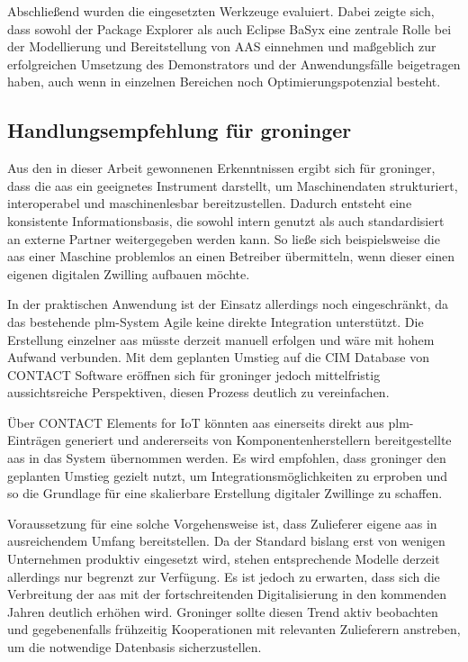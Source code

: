 Abschließend wurden die eingesetzten Werkzeuge evaluiert. 
Dabei zeigte sich, dass sowohl der Package Explorer als auch Eclipse BaSyx eine zentrale Rolle bei der Modellierung und Bereitstellung von AAS einnehmen und maßgeblich zur erfolgreichen Umsetzung des Demonstrators und der Anwendungsfälle beigetragen haben, auch wenn in einzelnen Bereichen noch Optimierungspotenzial besteht.

\newpage
\subsection{Handlungsempfehlung für groninger}

Aus den in dieser Arbeit gewonnenen Erkenntnissen ergibt sich für groninger, dass die \acs{aas} ein geeignetes Instrument darstellt, um Maschinendaten strukturiert, interoperabel und maschinenlesbar bereitzustellen. 
Dadurch entsteht eine konsistente Informationsbasis, die sowohl intern genutzt als auch standardisiert an externe Partner weitergegeben werden kann. 
So ließe sich beispielsweise die \acs{aas} einer Maschine problemlos an einen Betreiber übermitteln, wenn dieser einen eigenen digitalen Zwilling aufbauen möchte.

In der praktischen Anwendung ist der Einsatz allerdings noch eingeschränkt, da das bestehende \acs{plm}-System Agile keine direkte Integration unterstützt. 
Die Erstellung einzelner \acs{aas} müsste derzeit manuell erfolgen und wäre mit hohem Aufwand verbunden.
Mit dem geplanten Umstieg auf die CIM Database von CONTACT Software eröffnen sich für groninger jedoch mittelfristig aussichtsreiche Perspektiven, diesen Prozess deutlich zu vereinfachen. 

Über CONTACT Elements for IoT \cite{CONTACT} könnten \acs{aas} einerseits direkt aus \acs{plm}-Einträgen generiert und andererseits von Komponentenherstellern bereitgestellte \acs{aas} in das System übernommen werden. 
Es wird empfohlen, dass groninger den geplanten Umstieg gezielt nutzt, um Integrationsmöglichkeiten zu erproben und so die Grundlage für eine skalierbare Erstellung digitaler Zwillinge zu schaffen.

Voraussetzung für eine solche Vorgehensweise ist, dass Zulieferer eigene \acs{aas} in ausreichendem Umfang bereitstellen. 
Da der Standard bislang erst von wenigen Unternehmen produktiv eingesetzt wird, stehen entsprechende Modelle derzeit allerdings nur begrenzt zur Verfügung. 
Es ist jedoch zu erwarten, dass sich die Verbreitung der \acs{aas} mit der fortschreitenden Digitalisierung in den kommenden Jahren deutlich erhöhen wird. 
Groninger sollte diesen Trend aktiv beobachten und gegebenenfalls frühzeitig Kooperationen mit relevanten Zulieferern anstreben, um die notwendige Datenbasis sicherzustellen.

